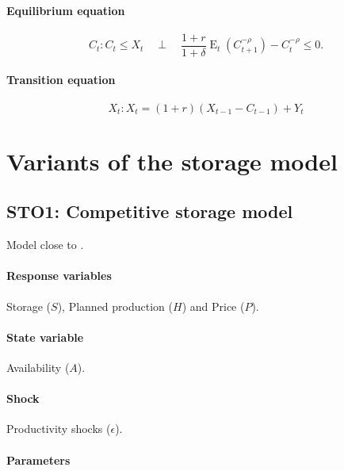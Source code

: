 \documentclass[11pt,fleqn]{article}
\DeclareMathOperator{\E}{E}
\newcommand{\CP}{\quad \perp \quad}
\begin{document}
\paragraph{Equilibrium equation}

\begin{equation}
  C_{t}: C_{t}\le X_{t} \CP
  \frac{1+r}{1+\delta}\E_{t}\left(C_{t+1}^{-\rho}\right)-C_{t}^{-\rho}\le 0.
\end{equation}

\paragraph{Transition equation}

\begin{equation}
  X_{t}: X_{t}=\left(1+r\right)\left(X_{t-1}-C_{t-1}\right)+Y_{t}
\end{equation}

\section{Variants of the storage model}
\label{sec:vari-stor-model}

\subsection{STO1: Competitive storage model}
\label{sec:comp-stor-model}

Model close to \citet{Wrig82}.

\paragraph{Response variables}
\label{sec:response-variables}

Storage ($S$), Planned production ($H$) and Price ($P$).

\paragraph{State variable}
\label{sec:state-variable}

Availability ($A$).

\paragraph{Shock}

Productivity shocks ($\epsilon$).

\paragraph{Parameters}
\end{document}
